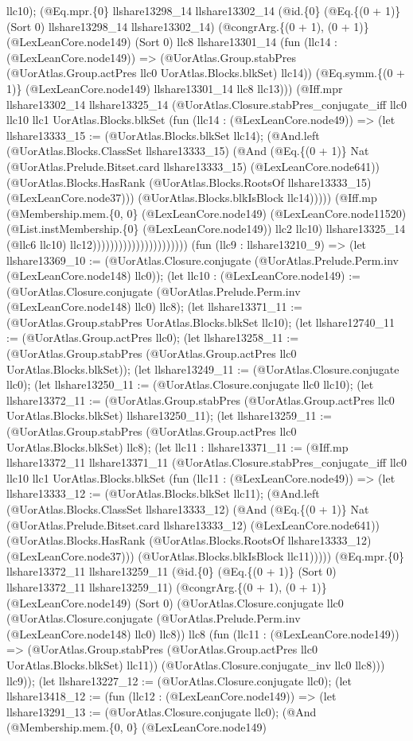 \documentclass[11pt]{article}
\begin{document}
llc10); (@Eq.mpr.\{0\} llshare13298\_14 llshare13302\_14 (@id.\{0\} (@Eq.\{(0 + 1)\} (Sort 0) llshare13298\_14 llshare13302\_14) (@congrArg.\{(0 + 1), (0 + 1)\} (@LexLeanCore.node149) (Sort 0) llc8 llshare13301\_14 (fun (llc14 : (@LexLeanCore.node149)) => (@UorAtlas.Group.stabPres (@UorAtlas.Group.actPres llc0 UorAtlas.Blocks.blkSet) llc14)) (@Eq.symm.\{(0 + 1)\} (@LexLeanCore.node149) llshare13301\_14 llc8 llc13))) (@Iff.mpr llshare13302\_14 llshare13325\_14 (@UorAtlas.Closure.stabPres\_conjugate\_iff llc0 llc10 llc1 UorAtlas.Blocks.blkSet (fun (llc14 : (@LexLeanCore.node49)) => (let llshare13333\_15 := (@UorAtlas.Blocks.blkSet llc14); (@And.left (@UorAtlas.Blocks.ClassSet llshare13333\_15) (@And (@Eq.\{(0 + 1)\} Nat (@UorAtlas.Prelude.Bitset.card llshare13333\_15) (@LexLeanCore.node641)) (@UorAtlas.Blocks.HasRank (@UorAtlas.Blocks.RootsOf llshare13333\_15) (@LexLeanCore.node37))) (@UorAtlas.Blocks.blkIsBlock llc14))))) (@Iff.mp (@Membership.mem.\{0, 0\} (@LexLeanCore.node149) (@LexLeanCore.node11520) (@List.instMembership.\{0\} (@LexLeanCore.node149)) llc2 llc10) llshare13325\_14 (@llc6 llc10) llc12)))))))))))))))))))))) (fun (llc9 : llshare13210\_9) => (let llshare13369\_10 := (@UorAtlas.Closure.conjugate (@UorAtlas.Prelude.Perm.inv (@LexLeanCore.node148) llc0)); (let llc10 : (@LexLeanCore.node149) := (@UorAtlas.Closure.conjugate (@UorAtlas.Prelude.Perm.inv (@LexLeanCore.node148) llc0) llc8); (let llshare13371\_11 := (@UorAtlas.Group.stabPres UorAtlas.Blocks.blkSet llc10); (let llshare12740\_11 := (@UorAtlas.Group.actPres llc0); (let llshare13258\_11 := (@UorAtlas.Group.stabPres (@UorAtlas.Group.actPres llc0 UorAtlas.Blocks.blkSet)); (let llshare13249\_11 := (@UorAtlas.Closure.conjugate llc0); (let llshare13250\_11 := (@UorAtlas.Closure.conjugate llc0 llc10); (let llshare13372\_11 := (@UorAtlas.Group.stabPres (@UorAtlas.Group.actPres llc0 UorAtlas.Blocks.blkSet) llshare13250\_11); (let llshare13259\_11 := (@UorAtlas.Group.stabPres (@UorAtlas.Group.actPres llc0 UorAtlas.Blocks.blkSet) llc8); (let llc11 : llshare13371\_11 := (@Iff.mp llshare13372\_11 llshare13371\_11 (@UorAtlas.Closure.stabPres\_conjugate\_iff llc0 llc10 llc1 UorAtlas.Blocks.blkSet (fun (llc11 : (@LexLeanCore.node49)) => (let llshare13333\_12 := (@UorAtlas.Blocks.blkSet llc11); (@And.left (@UorAtlas.Blocks.ClassSet llshare13333\_12) (@And (@Eq.\{(0 + 1)\} Nat (@UorAtlas.Prelude.Bitset.card llshare13333\_12) (@LexLeanCore.node641)) (@UorAtlas.Blocks.HasRank (@UorAtlas.Blocks.RootsOf llshare13333\_12) (@LexLeanCore.node37))) (@UorAtlas.Blocks.blkIsBlock llc11))))) (@Eq.mpr.\{0\} llshare13372\_11 llshare13259\_11 (@id.\{0\} (@Eq.\{(0 + 1)\} (Sort 0) llshare13372\_11 llshare13259\_11) (@congrArg.\{(0 + 1), (0 + 1)\} (@LexLeanCore.node149) (Sort 0) (@UorAtlas.Closure.conjugate llc0 (@UorAtlas.Closure.conjugate (@UorAtlas.Prelude.Perm.inv (@LexLeanCore.node148) llc0) llc8)) llc8 (fun (llc11 : (@LexLeanCore.node149)) => (@UorAtlas.Group.stabPres (@UorAtlas.Group.actPres llc0 UorAtlas.Blocks.blkSet) llc11)) (@UorAtlas.Closure.conjugate\_inv llc0 llc8))) llc9)); (let llshare13227\_12 := (@UorAtlas.Closure.conjugate llc0); (let llshare13418\_12 := (fun (llc12 : (@LexLeanCore.node149)) => (let llshare13291\_13 := (@UorAtlas.Closure.conjugate llc0); (@And (@Membership.mem.\{0, 0\} (@LexLeanCore.node149) 
\end{document}
